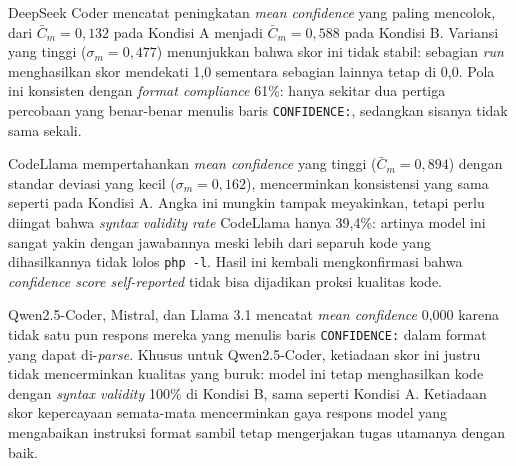 \begin{table}[h]
\caption{Statistik lengkap komparasi kelima model LLM pada Kondisi B}
\vspace{0.5em}
\centering
\label{tab:stats-table-b}
\end{table}
DeepSeek Coder mencatat peningkatan \textit{mean confidence} yang 
paling mencolok, dari $\bar{C}_m = 0{,}132$ pada Kondisi A menjadi 
$\bar{C}_m = 0{,}588$ pada Kondisi B. 
Variansi yang tinggi ($\sigma_m = 0{,}477$) menunjukkan bahwa 
skor ini tidak stabil: sebagian \textit{run} menghasilkan skor 
mendekati 1,0 sementara sebagian lainnya tetap di 0,0. Pola ini 
konsisten dengan \textit{format compliance} 61\%: hanya sekitar 
dua pertiga percobaan yang benar-benar menulis baris 
\texttt{CONFIDENCE:}, sedangkan sisanya tidak sama sekali.

CodeLlama mempertahankan \textit{mean confidence} yang tinggi 
($\bar{C}_m = 0{,}894$) dengan standar deviasi yang kecil 
($\sigma_m = 0{,}162$), mencerminkan konsistensi yang sama seperti 
pada Kondisi A. Angka ini mungkin 
tampak meyakinkan, tetapi perlu diingat bahwa \textit{syntax 
validity rate} CodeLlama hanya 39,4\%: artinya model ini sangat 
yakin dengan jawabannya meski lebih dari separuh kode yang 
dihasilkannya tidak lolos \texttt{php -l}. Hasil ini kembali 
mengkonfirmasi bahwa \textit{confidence score self-reported} tidak 
bisa dijadikan proksi kualitas kode.

Qwen2.5-Coder, Mistral, dan Llama 3.1 mencatat \textit{mean 
confidence} 0,000 karena tidak satu pun respons mereka yang 
menulis baris \texttt{CONFIDENCE:} dalam format yang dapat 
di-\textit{parse}. Khusus untuk Qwen2.5-Coder, ketiadaan skor ini 
justru tidak mencerminkan kualitas yang buruk: model ini tetap 
menghasilkan kode dengan \textit{syntax validity} 100\% di Kondisi 
B, sama seperti Kondisi A. Ketiadaan skor kepercayaan semata-mata 
mencerminkan gaya respons model yang mengabaikan instruksi format 
sambil tetap mengerjakan tugas utamanya dengan baik.

